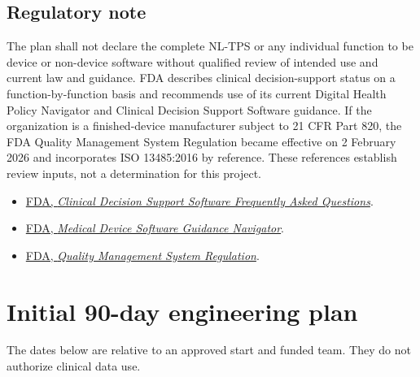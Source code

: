 \documentclass[11pt,letterpaper]{article}
\begin{document}
\subsection{Regulatory note}

The plan shall not declare the complete NL-TPS or any individual function to be device or non-device software without qualified review of intended use and current law and guidance. FDA describes clinical decision-support status on a function-by-function basis and recommends use of its current Digital Health Policy Navigator and Clinical Decision Support Software guidance. If the organization is a finished-device manufacturer subject to 21 CFR Part 820, the FDA Quality Management System Regulation became effective on 2 February 2026 and incorporates ISO 13485:2016 by reference. These references establish review inputs, not a determination for this project.

\begin{itemize}
\item \href{https://www.fda.gov/medical-devices/software-medical-device-samd/clinical-decision-support-software-frequently-asked-questions-faqs}{FDA, \emph{Clinical Decision Support Software Frequently Asked Questions}}.
\item \href{https://www.fda.gov/medical-devices/regulatory-accelerator/medical-device-software-guidance-navigator}{FDA, \emph{Medical Device Software Guidance Navigator}}.
\item \href{https://www.fda.gov/medical-devices/postmarket-requirements-devices/quality-management-system-regulation-qmsr}{FDA, \emph{Quality Management System Regulation}}.
\end{itemize}

\section{Initial 90-day engineering plan}

The dates below are relative to an approved start and funded team. They do not authorize clinical data use.
\end{document}
